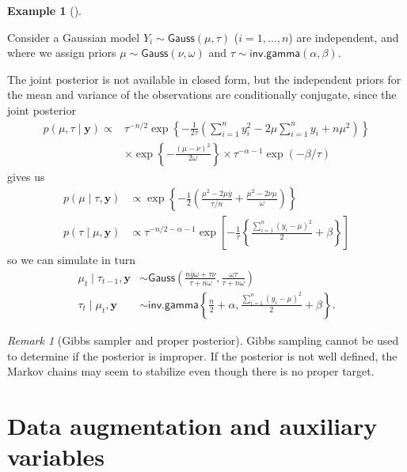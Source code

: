 \documentclass[
  11pt,
  letterpaper,
]{scrbook}
\theoremstyle{definition}
\newtheorem{example}{Example}[chapter]
\theoremstyle{plain}
\theoremstyle{plain}
\theoremstyle{plain}
\theoremstyle{definition}
\theoremstyle{definition}
\theoremstyle{plain}
\theoremstyle{plain}
\theoremstyle{remark}
\newtheorem*{remark}{Remark}
\begin{document}
\begin{example}[]\protect\hypertarget{exm-gaussian-gamma}{}\label{exm-gaussian-gamma}

Consider a Gaussian model \(Y_i \sim \mathsf{Gauss}(\mu, \tau)\)
(\(i=1, \ldots, n\)) are independent, and where we assign priors
\(\mu \sim \mathsf{Gauss}(\nu, \omega)\) and
\(\tau \sim \mathsf{inv. gamma}(\alpha, \beta).\)

The joint posterior is not available in closed form, but the independent
priors for the mean and variance of the observations are conditionally
conjugate, since the joint posterior \begin{align*}
p(\mu, \tau \mid \boldsymbol{y}) \propto& \tau^{-n/2}\exp\left\{-\frac{1}{2\tau}\left(\sum_{i=1}^n y_i^2 - 2\mu \sum_{i=1}^n y_i+n\mu^2 \right)\right\}\\& \times \exp\left\{-\frac{(\mu-\nu)^2}{2\omega}\right\} \times \tau^{-\alpha-1}\exp(-\beta/\tau)
\end{align*} gives us \begin{align*}
p(\mu \mid \tau, \boldsymbol{y}) &\propto \exp\left\{-\frac{1}{2} \left( \frac{\mu^2-2\mu\overline{y}}{\tau/n} + \frac{\mu^2-2\nu \mu}{\omega}\right)\right\}\\
p(\tau \mid \mu, \boldsymbol{y}) & \propto \tau^{-n/2-\alpha-1}\exp\left[-\frac{1}{\tau}\left\{\frac{\sum_{i=1}^n (y_i-\mu)^2}{2} + \beta \right\}\right]
\end{align*} so we can simulate in turn \begin{align*}
\mu_t \mid \tau_{t-1}, \boldsymbol{y} &\sim \mathsf{Gauss}\left(\frac{n\overline{y}\omega+\tau \nu}{\tau + n\omega}, \frac{\omega \tau}{\tau + n\omega}\right)\\
\tau_t \mid \mu_t, \boldsymbol{y} &\sim \mathsf{inv. gamma}\left\{\frac{n}{2}+\alpha, \frac{\sum_{i=1}^n (y_i-\mu)^2}{2} + \beta\right\}.
\end{align*}

\end{example}

\begin{remark}[Gibbs sampler and proper posterior]
Gibbs sampling cannot be used to determine if the posterior is improper.
If the posterior is not well defined, the Markov chains may seem to
stabilize even though there is no proper target.
\end{remark}

\section{Data augmentation and auxiliary variables}\label{sec-gibbs-da}
\end{document}
